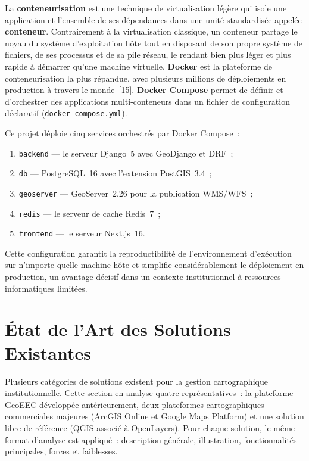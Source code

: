 \documentclass[12pt, a4paper]{report}
\newcommand{\kw}[1]{\textbf{#1}}
\begin{document}
La \kw{conteneurisation} est une technique de virtualisation légère qui isole une
application et l'ensemble de ses dépendances dans une unité standardisée appelée
\textbf{conteneur}. Contrairement à la virtualisation classique, un conteneur
partage le noyau du système d'exploitation hôte tout en disposant de son propre
système de fichiers, de ses processus et de sa pile réseau, le rendant bien plus
léger et plus rapide à démarrer qu'une machine virtuelle. \kw{Docker} est la
plateforme de conteneurisation la plus répandue, avec plusieurs millions de
déploiements en production à travers le monde~[15].
\kw{Docker Compose} permet de définir et d'orchestrer des applications
multi-conteneurs dans un fichier de configuration déclaratif
(\texttt{docker-compose.yml}).

Ce projet déploie cinq services orchestrés par Docker Compose~:
\begin{enumerate}[itemsep=2pt, topsep=4pt, leftmargin=1.5cm]
  \item \texttt{backend} --- le serveur Django~5 avec GeoDjango et DRF~;
  \item \texttt{db} --- PostgreSQL~16 avec l'extension PostGIS~3.4~;
  \item \texttt{geoserver} --- GeoServer~2.26 pour la publication WMS/WFS~;
  \item \texttt{redis} --- le serveur de cache Redis~7~;
  \item \texttt{frontend} --- le serveur Next.js~16.
\end{enumerate}

Cette configuration garantit la reproductibilité de l'environnement d'exécution
sur n'importe quelle machine hôte et simplifie considérablement le déploiement
en production, un avantage décisif dans un contexte institutionnel à ressources
informatiques limitées.

\section{État de l'Art des Solutions Existantes}
\label{sec:etat-art}

Plusieurs catégories de solutions existent pour la gestion cartographique
institutionnelle. Cette section en analyse quatre représentatives~: la plateforme
GeoEEC développée antérieurement, deux plateformes cartographiques commerciales
majeures (ArcGIS Online et Google Maps Platform) et une solution libre de
référence (QGIS associé à OpenLayers). Pour chaque solution, le même format
d'analyse est appliqué~: description générale, illustration, fonctionnalités
principales, forces et faiblesses.
\end{document}
